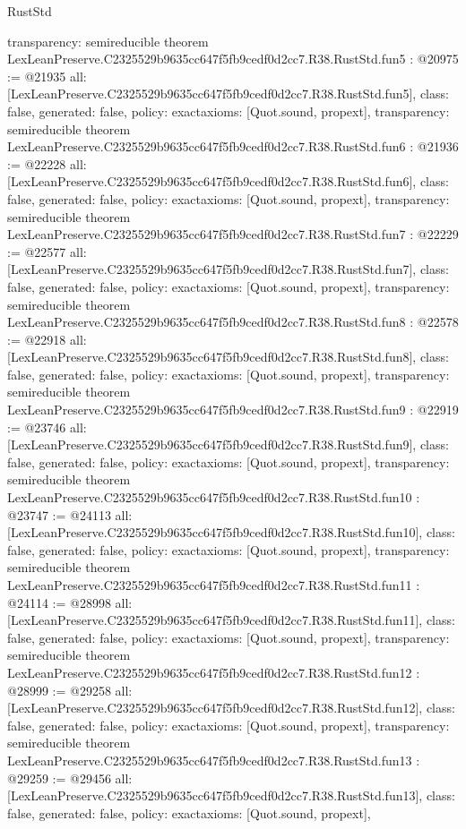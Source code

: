 \begin{lexlean}{RustStd}
\begin{coremodule}
{  transparency: semireducible
}
theorem LexLeanPreserve.C2325529b9635cc647f5fb9cedf0d2cc7.R38.RustStd.fun5 : @20975 := @21935 {
  all: [LexLeanPreserve.C2325529b9635cc647f5fb9cedf0d2cc7.R38.RustStd.fun5],
  class: false,
  generated: false,
  policy: exact{axioms: [Quot.sound, propext]},
  transparency: semireducible
}
theorem LexLeanPreserve.C2325529b9635cc647f5fb9cedf0d2cc7.R38.RustStd.fun6 : @21936 := @22228 {
  all: [LexLeanPreserve.C2325529b9635cc647f5fb9cedf0d2cc7.R38.RustStd.fun6],
  class: false,
  generated: false,
  policy: exact{axioms: [Quot.sound, propext]},
  transparency: semireducible
}
theorem LexLeanPreserve.C2325529b9635cc647f5fb9cedf0d2cc7.R38.RustStd.fun7 : @22229 := @22577 {
  all: [LexLeanPreserve.C2325529b9635cc647f5fb9cedf0d2cc7.R38.RustStd.fun7],
  class: false,
  generated: false,
  policy: exact{axioms: [Quot.sound, propext]},
  transparency: semireducible
}
theorem LexLeanPreserve.C2325529b9635cc647f5fb9cedf0d2cc7.R38.RustStd.fun8 : @22578 := @22918 {
  all: [LexLeanPreserve.C2325529b9635cc647f5fb9cedf0d2cc7.R38.RustStd.fun8],
  class: false,
  generated: false,
  policy: exact{axioms: [Quot.sound, propext]},
  transparency: semireducible
}
theorem LexLeanPreserve.C2325529b9635cc647f5fb9cedf0d2cc7.R38.RustStd.fun9 : @22919 := @23746 {
  all: [LexLeanPreserve.C2325529b9635cc647f5fb9cedf0d2cc7.R38.RustStd.fun9],
  class: false,
  generated: false,
  policy: exact{axioms: [Quot.sound, propext]},
  transparency: semireducible
}
theorem LexLeanPreserve.C2325529b9635cc647f5fb9cedf0d2cc7.R38.RustStd.fun10 : @23747 := @24113 {
  all: [LexLeanPreserve.C2325529b9635cc647f5fb9cedf0d2cc7.R38.RustStd.fun10],
  class: false,
  generated: false,
  policy: exact{axioms: [Quot.sound, propext]},
  transparency: semireducible
}
theorem LexLeanPreserve.C2325529b9635cc647f5fb9cedf0d2cc7.R38.RustStd.fun11 : @24114 := @28998 {
  all: [LexLeanPreserve.C2325529b9635cc647f5fb9cedf0d2cc7.R38.RustStd.fun11],
  class: false,
  generated: false,
  policy: exact{axioms: [Quot.sound, propext]},
  transparency: semireducible
}
theorem LexLeanPreserve.C2325529b9635cc647f5fb9cedf0d2cc7.R38.RustStd.fun12 : @28999 := @29258 {
  all: [LexLeanPreserve.C2325529b9635cc647f5fb9cedf0d2cc7.R38.RustStd.fun12],
  class: false,
  generated: false,
  policy: exact{axioms: [Quot.sound, propext]},
  transparency: semireducible
}
theorem LexLeanPreserve.C2325529b9635cc647f5fb9cedf0d2cc7.R38.RustStd.fun13 : @29259 := @29456 {
  all: [LexLeanPreserve.C2325529b9635cc647f5fb9cedf0d2cc7.R38.RustStd.fun13],
  class: false,
  generated: false,
  policy: exact{axioms: [Quot.sound, propext]},
}
\end{coremodule}
\end{lexlean}
